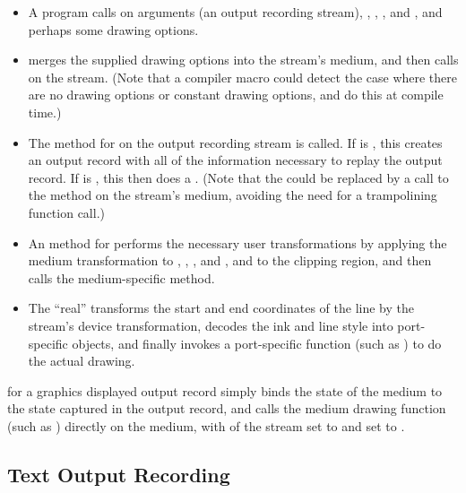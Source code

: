 \begin{itemize}
\item A program calls  on arguments  (an output
recording stream), , , , and , and perhaps some
drawing options.

\item {} merges the supplied drawing options into the stream's
medium, and then calls  on the stream.  (Note that a
compiler macro could detect the case where there are no drawing options or
constant drawing options, and do this at compile time.)

\item The  method for  on the output recording
stream is called.  If  is , this creates an
output record with all of the information necessary to replay the output record.
If  is , this then does a .
(Note that the  could be replaced by a call to the
 method on the stream's medium, avoiding the need for a
trampolining function call.)

\item An  method for  performs the necessary
user transformations by applying the medium transformation to ,
, , and , and to the clipping region, and then calls the
medium-specific method.

\item The ``real''  transforms the start and end
coordinates of the line by the stream's device transformation, decodes the ink
and line style into port-specific objects, and finally invokes a port-specific
function (such as ) to do the actual drawing.
\end{itemize}

 for a graphics displayed output record simply binds
the state of the medium to the state captured in the output record, and calls
the medium drawing function (such as ) directly on the
medium, with  of the stream set to  and
 set to .


\subsection {Text Output Recording}

